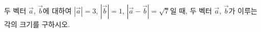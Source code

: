 두 벡터 $\vec{a}$, $\vec{b}$에 대하여 $|\vec{a}|=3$, $|\vec{b}|=1$, $|\vec{a}-\vec{b}|=\sqrt{7}$일 때, 두 벡터 $\vec{a}$, $\vec{b}$가 이루는 각의 크기를 구하시오.
